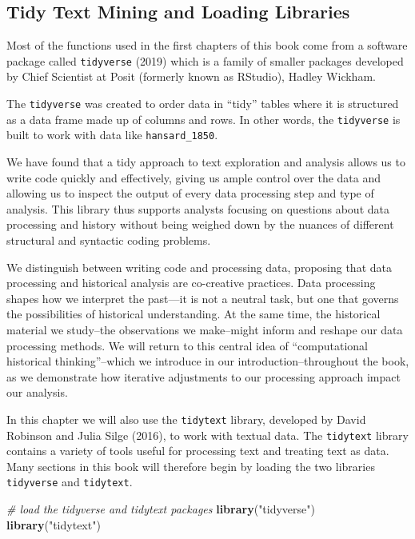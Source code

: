 \documentclass[
]{article}
\newenvironment{Shaded}{\begin{snugshade}}{\end{snugshade}}
\newcommand{\CommentTok}[1]{\textcolor[rgb]{0.56,0.35,0.01}{\textit{#1}}}
\newcommand{\FunctionTok}[1]{\textcolor[rgb]{0.13,0.29,0.53}{\textbf{#1}}}
\newcommand{\NormalTok}[1]{#1}
\newcommand{\StringTok}[1]{\textcolor[rgb]{0.31,0.60,0.02}{#1}}
\begin{document}
\subsection{Tidy Text Mining and Loading
Libraries}\label{tidy-text-mining-and-loading-libraries}

Most of the functions used in the first chapters of this book come from
a software package called \texttt{tidyverse} (2019) which is a family of
smaller packages developed by Chief Scientist at Posit (formerly known
as RStudio), Hadley Wickham.

The \texttt{tidyverse} was created to order data in ``tidy'' tables
where it is structured as a data frame made up of columns and rows. In
other words, the \texttt{tidyverse} is built to work with data like
\texttt{hansard\_1850}.

We have found that a tidy approach to text exploration and analysis
allows us to write code quickly and effectively, giving us ample control
over the data and allowing us to inspect the output of every data
processing step and type of analysis. This library thus supports
analysts focusing on questions about data processing and history without
being weighed down by the nuances of different structural and syntactic
coding problems.

We distinguish between writing code and processing data, proposing that
data processing and historical analysis are co-creative practices. Data
processing shapes how we interpret the past---it is not a neutral task,
but one that governs the possibilities of historical understanding. At
the same time, the historical material we study--the observations we
make--might inform and reshape our data processing methods. We will
return to this central idea of ``computational historical
thinking''--which we introduce in our introduction--throughout the book,
as we demonstrate how iterative adjustments to our processing approach
impact our analysis.

In this chapter we will also use the \texttt{tidytext} library,
developed by David Robinson and Julia Silge (2016), to work with textual
data. The \texttt{tidytext} library contains a variety of tools useful
for processing text and treating text as data. Many sections in this
book will therefore begin by loading the two libraries
\texttt{tidyverse} and \texttt{tidytext}.

\begin{Shaded}
\begin{Highlighting}[]
\CommentTok{\# load the tidyverse and tidytext packages}
\FunctionTok{library}\NormalTok{(}\StringTok{"tidyverse"}\NormalTok{)}
\FunctionTok{library}\NormalTok{(}\StringTok{"tidytext"}\NormalTok{)}
\end{Highlighting}
\end{Shaded}
\end{document}
